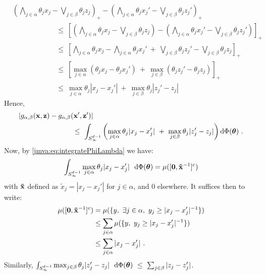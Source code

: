 \begin{align*}
  &\left(\bigwedge_{j \in \alpha}{\theta_j x_j} - \bigvee_{j \in\beta} \theta_j z_j\right)_+ - \left(\bigwedge_{j \in \alpha}{\theta_j x_j'} - \bigvee_{j \in\beta} \theta_j z_j'\right)_+ \nonumber\\
  &~~~~~~~~~~~~~~~~~~~~~~~~~~~~\le~
 \left[\left(\bigwedge_{j \in \alpha}{\theta_j x_j} -
      \bigvee_{j \in\beta} \theta_j z_j\right) - \left(\bigwedge_{j
        \in \alpha}{\theta_j x_j'} - \bigvee_{j \in\beta} \theta_j
      z_j'\right)\right]_+ \nonumber\\
&~~~~~~~~~~~~~~~~~~~~~~~~~~~~\le~
\left[\bigwedge_{j \in \alpha}{\theta_j x_j} - \bigwedge_{j \in
  \alpha}{\theta_j x_j'} ~+~ \bigvee_{j \in\beta} \theta_j z_j' -
\bigvee_{j \in\beta} \theta_j z_j\right]_+\nonumber\\
&~~~~~~~~~~~~~~~~~~~~~~~~~~~~\le~
    \left[\max_{j \in \alpha}(\theta_j x_j - \theta_j x_j')
      ~+~ \max_{j \in\beta} (\theta_j z_j' - \theta_j z_j) \right]_+ \\%
 &~~~~~~~~~~~~~~~~~~~~~~~~~~~~\le~
\max_{j \in \alpha}\theta_j|{ x_j} - { x_j'}| ~+~ \max_{j \in\beta} \theta_j | z_j' -  z_j|
\end{align*}
Hence,
\begin{align*}
&|g_{\alpha,\beta}(\mathbf x, \mathbf z) - g_{\alpha,\beta}(\mathbf x', \mathbf z')|\\
&~~~~~~~~~~~~~~~~~~~~~~~\le~\int_{S^{d-1}_\infty} \left(\max_{j \in \alpha}\theta_j|{ x_j} - { x_j'}| ~+~ \max_{j \in\beta} \theta_j | z_j' -  z_j|\right)  \mathrm{d}\Phi(\boldsymbol{\theta})~.
\end{align*}
Now, by \eqref{jmva:eq:integratePhiLambda} we have:
$$\int_{S^{d-1}_\infty} \max_{j \in \alpha}\theta_j|{ x_j} - { x_j'}| ~~ \mathrm{d}\Phi(\boldsymbol{\theta}) = \mu([\mathbf 0, \mathbf{\tilde x}^{-1}]^c)$$ with $\mathbf{\tilde x}$ defined as $\tilde x_j = |x_j - x_j'|$ for $j\in\alpha$, and $0$ elsewhere.
It suffices then to write:
\begin{align*}
\mu([\mathbf 0, \mathbf{\tilde x}^{-1}]^c) &= \mu(\{y,~\exists j \in \alpha,~y_j \ge |x_j-x_j'|^{-1}\})\\
 &\le \sum_{j\in\alpha}\mu(\{y,~y_j \ge |x_j-x_j'|^{-1}\})\\
 &\le \sum_{j \in \alpha} |x_j-x_j'|~.
\end{align*}
Similarly, $\int_{S^{d-1}_\infty} \max_{j \in\beta} \theta_j | z_j' -  z_j|  ~~ \mathrm{d}\Phi(\boldsymbol{\theta}) ~\le~ \sum_{j \in \beta} |z_j-z_j'|$.

